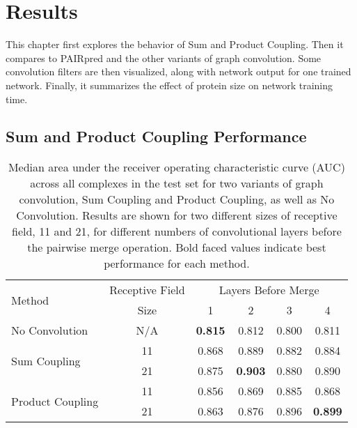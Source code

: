 \chapter{Results}
\label{chap:results}


This chapter first explores the behavior of Sum and Product Coupling.
Then it compares to PAIRpred and the other variants of graph convolution.
Some convolution filters are then visualized, along with network output for one trained network.
Finally, it summarizes the effect of protein size on network training time.


\section{Sum and Product Coupling Performance}

\begin{table}
	\begin{center}
		\begin{tabular}{lccccc}
			\toprule
			\multirow{2}{*}{Method} &
			Receptive Field & \multicolumn{4}{c}{Layers Before Merge} \\
			& Size & 1 & {2} & {3} & {4} \\
			\midrule
			No Convolution & N/A & \textbf{0.815} & 0.812 & 0.800 & 0.811  \\\cline{1-6}
			\multirow{2}{*}{Sum Coupling} & 11 & 0.868 & 0.889 & 0.882 & 0.884 \\
			& 21 & 0.875 & \textbf{0.903} & 0.880 & 0.890 \\\cline{1-6}
			\multirow{2}{*}{Product Coupling} & 11 & 0.856 & 0.869 & 0.885 & 0.868 \\
			& 21 & 0.863 & 0.876 & 0.896 & \textbf{0.899} \\
			\bottomrule
		\end{tabular}
		\caption{Median area under the receiver operating characteristic curve (AUC) across all complexes in the test set for two variants of graph convolution, Sum Coupling and Product Coupling, as well as No Convolution. Results are shown for two different sizes of receptive field, 11 and 21, for different numbers of convolutional layers before the pairwise merge operation. Bold faced values indicate best performance for each method.
		\label{tab:med_auc}}
	\end{center}
\end{table}

